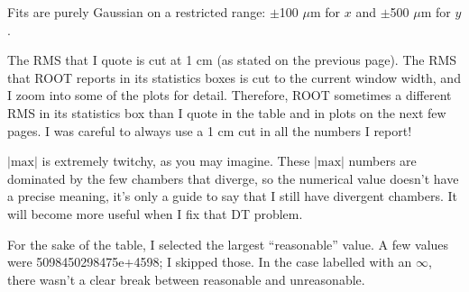 \documentclass[compress]{beamer}
\begin{document}
\begin{notes}
\small
\item Fits are purely Gaussian on a restricted range: $\pm$100 $\mu$m for $x$ and $\pm$500 $\mu$m for $y$.
\item The RMS that I quote is cut at 1 cm (as stated on the previous page).  The RMS that ROOT reports in its statistics boxes is cut to the current window width, and I zoom into some of the plots for detail.  Therefore, ROOT sometimes a different RMS in its statistics box than I quote in the table and in plots on the next few pages.  I was careful to always use a 1 cm cut in all the numbers I report!
\item $|\mbox{max}|$ is extremely twitchy, as you may imagine.  These $|\mbox{max}|$ numbers are dominated by the few chambers that diverge, so the numerical value doesn't have a precise meaning, it's only a guide to say that I still have divergent chambers.  It will become more useful when I fix that DT problem.
\item For the sake of the table, I selected the largest ``reasonable'' value.  A few values were 5098450298475e+4598; I skipped those.  In the case labelled with an $\infty$, there wasn't a clear break between reasonable and unreasonable.
\end{notes}
\end{document}
